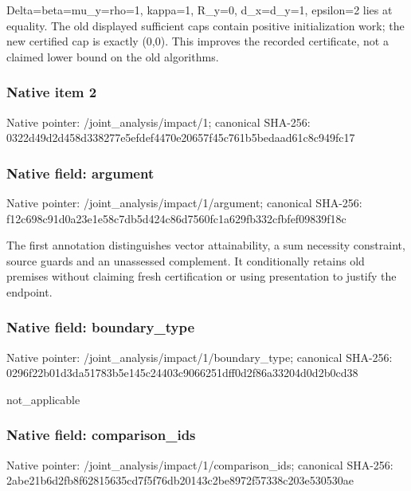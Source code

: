 \documentclass[10pt,a4paper]{article}
\begin{document}
\begingroup\raggedright\sloppy Delta=\allowbreak{}beta=\allowbreak{}mu\_\allowbreak{}y=\allowbreak{}rho=\allowbreak{}1,\allowbreak{} kappa=\allowbreak{}1,\allowbreak{} R\_\allowbreak{}y=\allowbreak{}0,\allowbreak{} d\_\allowbreak{}x=\allowbreak{}d\_\allowbreak{}y=\allowbreak{}1,\allowbreak{} epsilon=\allowbreak{}2 lies at equality. The old displayed sufficient caps contain positive initialization work;\allowbreak{} the new certified cap is exactly (0,\allowbreak{}0). This improves the recorded certificate,\allowbreak{} not a claimed lower bound on the old algorithms.\par\endgroup

\subsubsection{Native item 2}
Native pointer: /joint\_\allowbreak{}analysis/impact/1; canonical SHA-256: 0322d49d2d458d338277e5efdef4470e20657f45c761b5bedaad61c8c949fc17

\subsubsection{Native field: argument}
Native pointer: /joint\_\allowbreak{}analysis/impact/1/argument; canonical SHA-256: f12c698c91d0a23e1e58c7db5d424c86d7560fc1a629fb332cfbfef09839f18c

\begingroup\raggedright\sloppy The first annotation distinguishes vector attainability,\allowbreak{} a sum necessity constraint,\allowbreak{} source guards and an unassessed complement. It conditionally retains old premises without claiming fresh certification or using presentation to justify the endpoint.\par\endgroup

\subsubsection{Native field: boundary\_\allowbreak{}type}
Native pointer: /joint\_\allowbreak{}analysis/impact/1/boundary\_\allowbreak{}type; canonical SHA-256: 0296f22b01d3da51783b5e145c24403c9066251dff0d2f86a33204d0d2b0cd38

\begingroup\raggedright\sloppy not\_\allowbreak{}applicable\par\endgroup

\subsubsection{Native field: comparison\_\allowbreak{}ids}
Native pointer: /joint\_\allowbreak{}analysis/impact/1/comparison\_\allowbreak{}ids; canonical SHA-256: 2abe21b6d2fb8f62815635cd7f5f76db20143c2be8972f57338c203e530530ae
\end{document}
